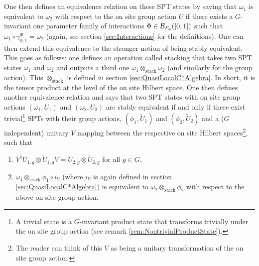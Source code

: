 \documentclass[12pt,a4paper,twoside]{article}
\numberwithin{equation}{section}
\begin{document}
\\\\
One then defines an equivalence relation on these SPT states by saying that $\omega_1$ is equivalent to $\omega_2$ with respect to the on site group action $U$ if there exists a $G$-invariant one parameter family of interactions $\Phi\in\mathcal B_{F_\phi}([0,1])$ such that $\omega_1\circ\gamma^\Phi_{0;1}=\omega_2$ (again, see section \ref{sec:Interactions} for the definitions). One can then extend this equivalence to the stronger notion of being stably equivalent. This goes as follows: one defines an operation called stacking that takes two SPT states $\omega_1$ and $\omega_2$ and outputs a third one $\omega_1\otimes_{\text{stack}}\omega_2$ (and similarly for the group action). This $\otimes_\text{stack}$ is defined in section \ref{sec:QuasiLocalC*Algebra}. In short, it is the tensor product at the level of the on site Hilbert space. One then defines another equivalence relation and says that two SPT states with on site group actions $(\omega_1,U_1)$ and $(\omega_2,U_2)$ are stably equivalent if and only if there exist trivial\footnote{A trivial state is a $G$-invariant product state that transforms trivially under the on site group action (see remark \ref{rem:NontrivialProductState}).} SPTs with their group actions, $(\phi_1,\tilde{U}_1)$ and $(\phi_2,\tilde{U}_2)$ and a ($G$ independent) unitary $V$ mapping between the respective on site Hilbert spaces\footnote{The reader can think of this $V$ as being a unitary transformation of the on site group action.}, such that
\begin{enumerate}
	\item $V^\dagger U_{1,g}\otimes \tilde{U}_{1,g}V=U_{2,g}\otimes \tilde{U}_{2,g}$ for all $g\in G$.
	\item $\omega_1\otimes_{\text{stack}}\phi_1\circ i_V$ (where $i_V$ is again defined in section \ref{sec:QuasiLocalC*Algebra}) is equivalent to $\omega_2\otimes_{\text{stack}}\phi_2$ with respect to the above on site group action.
\end{enumerate}
\end{document}
